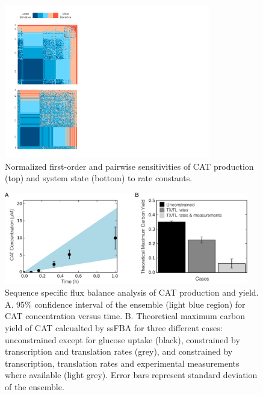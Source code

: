 \documentclass[12pt]{article}
\begin{document}
\begin{figure}[ht]
\centering
\includegraphics[width=0.8\textwidth,trim=0 28 615 40,clip]{./Figures/Sensitivity.pdf}
\caption{Normalized first-order and pairwise sensitivities of CAT production (top) and system state (bottom) to rate constants.}
\label{fig:Sensitivity}
\end{figure}

\begin{figure}[ht]
\centering
\includegraphics[width=0.95\textwidth]{./Figures/CAT_prod_yield.pdf}
\caption{Sequence specific flux balance analysis of CAT production and yield. A. 95\% confidence interval of the ensemble (light blue region) for CAT concentration versus time. B. Theoretical maximum carbon yield of CAT calcualted by ssFBA for three different cases: unconstrained except for glucose uptake (black), constrained by transcription and translation rates (grey), and constrained by transcription, translation rates and experimental measurements where available (light grey). Error bars represent standard deviation of the ensemble.}
\label{fig:CATProdYield}
\end{figure}
\end{document}
